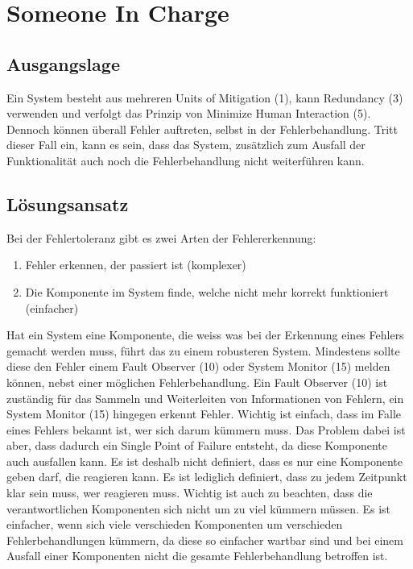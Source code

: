 \section{Someone In Charge}

\subsection{Ausgangslage}
Ein System besteht aus mehreren Units of Mitigation (1), kann Redundancy (3) verwenden und verfolgt das Prinzip von Minimize Human Interaction (5).
Dennoch können überall Fehler auftreten, selbst in der Fehlerbehandlung. Tritt dieser Fall ein, kann es sein, dass das System, zusätzlich zum Ausfall der Funktionalität auch noch die Fehlerbehandlung nicht weiterführen kann.

\subsection{Lösungsansatz}

Bei der Fehlertoleranz gibt es zwei Arten der Fehlererkennung:
\begin{enumerate}
	\item Fehler erkennen, der passiert ist (komplexer)
	\item Die Komponente im System finde, welche nicht mehr korrekt funktioniert (einfacher)
\end{enumerate}
Hat ein System eine Komponente, die weiss was bei der Erkennung eines Fehlers gemacht werden muss, führt das zu einem robusteren System. Mindestens sollte diese den Fehler einem Fault Observer (10) oder System Monitor (15) melden können, nebst einer möglichen Fehlerbehandlung. Ein Fault Observer (10) ist zuständig für das Sammeln und Weiterleiten von Informationen von Fehlern, ein System Monitor (15) hingegen erkennt Fehler.
Wichtig ist einfach, dass im Falle eines Fehlers bekannt ist, wer sich darum kümmern muss.
Das Problem dabei ist aber, dass dadurch ein Single Point of Failure entsteht, da diese Komponente auch ausfallen kann. Es ist deshalb nicht definiert, dass es nur eine Komponente geben darf, die reagieren kann. Es ist lediglich definiert, dass zu jedem Zeitpunkt klar sein muss, wer reagieren muss.
Wichtig ist auch zu beachten, dass die verantwortlichen Komponenten sich nicht um zu viel kümmern müssen. Es ist einfacher, wenn sich viele verschieden Komponenten um verschieden Fehlerbehandlungen kümmern, da diese so einfacher wartbar sind und bei einem Ausfall einer Komponenten nicht die gesamte Fehlerbehandlung betroffen ist.

